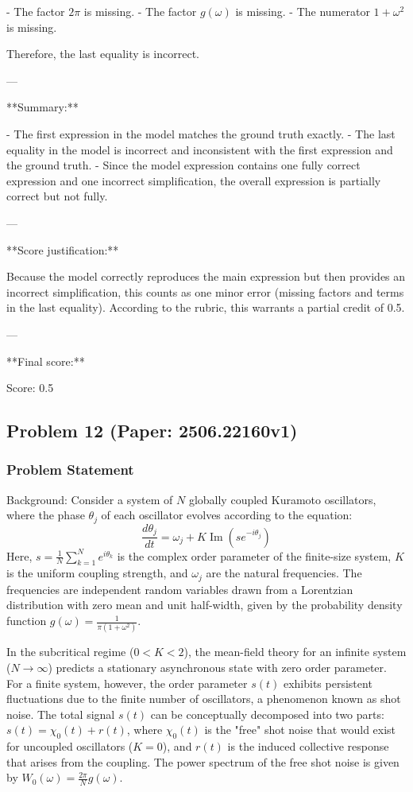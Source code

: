 \documentclass[10pt]{article}
\begin{document}
- The factor $2\pi$ is missing.
- The factor $g(\omega)$ is missing.
- The numerator $1 + \omega^2$ is missing.

Therefore, the last equality is incorrect.

---

**Summary:**

- The first expression in the model matches the ground truth exactly.
- The last equality in the model is incorrect and inconsistent with the first expression and the ground truth.
- Since the model expression contains one fully correct expression and one incorrect simplification, the overall expression is partially correct but not fully.

---

**Score justification:**

Because the model correctly reproduces the main expression but then provides an incorrect simplification, this counts as one minor error (missing factors and terms in the last equality). According to the rubric, this warrants a partial credit of 0.5.

---

**Final score:**

Score: 0.5

\newpage
\subsection*{Problem 12 (Paper: 2506.22160v1)}
\subsubsection*{Problem Statement}
Background:
Consider a system of $N$ globally coupled Kuramoto oscillators, where the phase $\theta_j$ of each oscillator evolves according to the equation:
$$ \frac{d\theta_j}{dt} = \omega_j + K \operatorname{Im} (s e^{-i\theta_j}) $$
Here, $s = \frac{1}{N} \sum_{k=1}^N e^{i\theta_k}$ is the complex order parameter of the finite-size system, $K$ is the uniform coupling strength, and $\omega_j$ are the natural frequencies. The frequencies are independent random variables drawn from a Lorentzian distribution with zero mean and unit half-width, given by the probability density function $g(\omega) = \frac{1}{\pi(1+\omega^2)}$.

In the subcritical regime ($0 < K < 2$), the mean-field theory for an infinite system ($N \to \infty$) predicts a stationary asynchronous state with zero order parameter. For a finite system, however, the order parameter $s(t)$ exhibits persistent fluctuations due to the finite number of oscillators, a phenomenon known as shot noise. The total signal $s(t)$ can be conceptually decomposed into two parts: $s(t) = \chi_0(t) + r(t)$, where $\chi_0(t)$ is the "free" shot noise that would exist for uncoupled oscillators ($K=0$), and $r(t)$ is the induced collective response that arises from the coupling. The power spectrum of the free shot noise is given by $W_0(\omega) = \frac{2\pi}{N} g(\omega)$.
\end{document}
